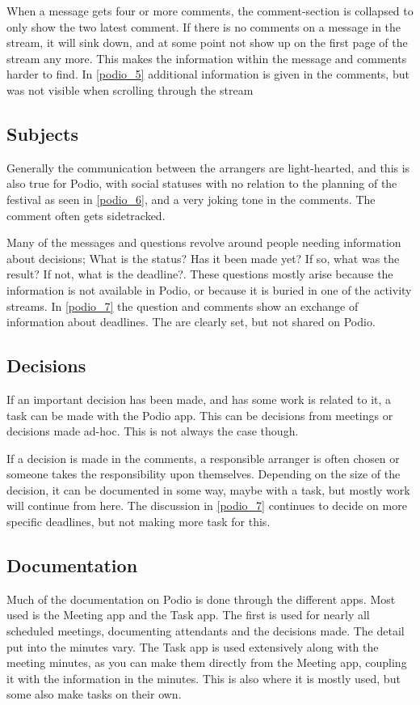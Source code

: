 When a message gets four or more comments, the comment-section is collapsed to only show the two latest comment. If there is no comments on a message in the stream, it will sink down, and at some point not show up on the first page of the stream any more. This makes the information within the message and comments harder to find. In \ref{podio_5} additional information is given in the comments, but was not visible when scrolling through the stream\\

\subsection{Subjects}
\label{podio_subj}
Generally the communication between the arrangers are light-hearted, and this is also true for Podio, with social statuses with no relation to the planning of the festival as seen in \ref{podio_6}, and a very joking tone in the comments. The comment often gets sidetracked.

Many of the messages and questions revolve around people needing information about decisions; What is the status? Has it been made yet? If so, what was the result? If not, what is the deadline?. These questions mostly arise because the information is not available in Podio, or because it is buried in one of the activity streams. In \ref{podio_7} the question and comments show an exchange of information about deadlines. The are clearly set, but not shared on Podio.

\subsection{Decisions}
\label{podio_decis}
If an important decision has been made, and has some work is related to it, a task can be made with the Podio app. This can be decisions from meetings or decisions made ad-hoc. This is not always the case though. 

If a decision is made in the comments, a responsible arranger is often chosen or someone takes the responsibility upon themselves. Depending on the size of the decision, it can be documented in some way, maybe with a task, but mostly work will continue from here. The discussion in \ref{podio_7} continues to decide on more specific deadlines, but not making more task for this. 

\subsection{Documentation}
\label{podio_doc}
Much of the documentation on Podio is done through the different apps. Most used is the Meeting app and the Task app. The first is used for nearly all scheduled meetings, documenting attendants and the decisions made. The detail put into the minutes vary. The Task app is used extensively along with the meeting minutes, as you can make them directly from the Meeting app, coupling it with the information in the minutes. This is also where it is mostly used, but some also make tasks on their own. \\

